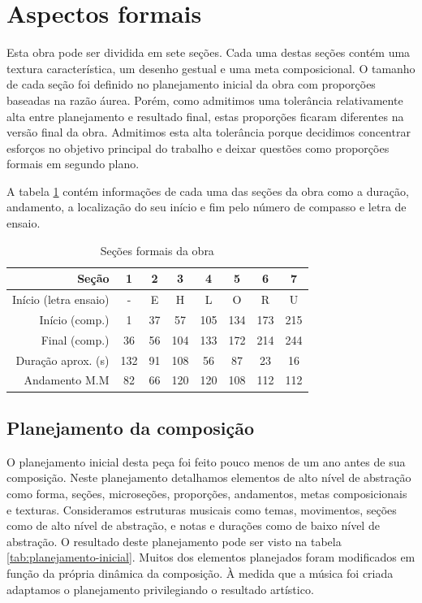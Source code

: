 \section{Aspectos formais}
\label{sec:aspectos-formais}

Esta obra pode ser dividida em sete seções. Cada uma destas seções
contém uma textura característica, um desenho gestual e uma meta
composicional.
O tamanho de cada seção foi definido no planejamento inicial da obra
com proporções baseadas na razão áurea.
Porém, como admitimos uma tolerância relativamente alta entre
planejamento e resultado final, estas proporções ficaram diferentes na
versão final da obra.
Admitimos esta alta tolerância porque decidimos concentrar esforços no
objetivo principal do trabalho e deixar questões como proporções
formais em segundo plano.

A tabela \ref{tab:secoes-obra} contém informações de cada uma das
seções da obra como a duração, andamento, a localização do seu início
e fim pelo número de compasso e letra de ensaio.

\begin{table}
  \centering
  \begin{tabular}{r|ccccccc}
    Seção & 1 & 2 & 3 & 4 & 5 & 6 & 7 \\
    \hline
    Início (letra ensaio) & - & E & H & L & O & R & U \\
    Início (comp.) & 1 & 37 & 57 & 105 & 134 & 173 & 215 \\
    Final (comp.) & 36 & 56 & 104 & 133 & 172 & 214 & 244 \\
    Duração aprox. (s) & 132 & 91 & 108 & 56 & 87 & 23 & 16\\
    Andamento M.M & 82 & 66 & 120 & 120 & 108 & 112 & 112 \\
  \end{tabular}
  \caption{Seções formais da obra}
  \label{tab:secoes-obra}
\end{table}

\subsection{Planejamento da composição}
\label{sec:plan-da-comp}

O planejamento inicial desta peça foi feito pouco menos de um ano
antes de sua composição. Neste planejamento detalhamos elementos de
alto nível de abstração como forma, seções, microseções, proporções,
andamentos, metas composicionais e texturas. Consideramos estruturas
musicais como temas, movimentos, seções como de alto nível de
abstração, e notas e durações como de baixo nível de abstração. O
resultado deste planejamento pode ser visto na tabela
\ref{tab:planejamento-inicial}. Muitos dos elementos planejados foram
modificados em função da própria dinâmica da composição. À medida que
a música foi criada adaptamos o planejamento privilegiando o resultado
artístico.

